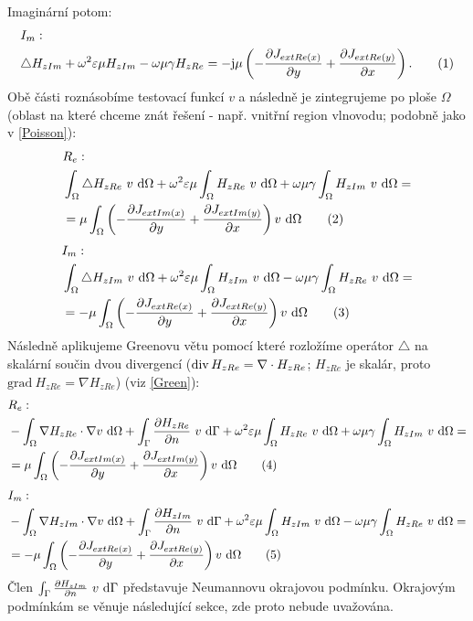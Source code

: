 \documentclass[12pt,a4paper,oneside]{article}
\numberwithin{equation}{section} %
\numberwithin{figure}{section} %
\numberwithin{table}{section} %
\newcommand{\mj}{\mathrm{j}} %
\newcommand{\grad}{\mathrm{grad}\ }
\newcommand\numberthis{\addtocounter{equation}{1}\tag{\theequation}}
\begin{document}
Imaginární potom:
\begin{align*}
&I_{m}:
\\
&\triangle H _{zIm} + \omega ^2 \varepsilon \mu H _{zIm} - \omega \mu \gamma H _{zRe} = - \mj \mu \left( - \frac{\partial J _{extRe(x)}}{\partial y} + \frac{\partial J _{extRe(y)}}{\partial x} \right) .
\numberthis
\end{align*}
Obě části roznásobíme testovací funkcí $v$ a následně je  zintegrujeme po ploše $\Omega$ (oblast na které chceme znát řešení - např. vnitřní region vlnovodu; podobně jako v \ref{Poisson}):
\begin{align*}
&R_e:
\\
&\int _{\Omega} \triangle H _{zRe} ~ v ~ \ud \Omega + \omega ^2 \varepsilon \mu \int _{\Omega} H _{zRe} ~ v ~ \ud \Omega + \omega \mu \gamma \int _{\Omega} H _{zIm} ~ v ~ \ud \Omega = 
\\
&= \mu \int _{\Omega} \left( - \frac{\partial J _{extIm(x)}}{\partial y} + \frac{\partial J _{extIm(y)}}{\partial x} \right) v ~ \ud \Omega
\numberthis
\end{align*}
\begin{align*}
&I_m:
\\
&\int _{\Omega} \triangle H _{zIm} ~ v ~ \ud \Omega + \omega ^2 \varepsilon \mu \int _{\Omega} H _{zIm} ~ v ~ \ud \Omega - \omega \mu \gamma \int _{\Omega} H _{zRe} ~ v ~ \ud \Omega = 
\\
&= - \mu \int _{\Omega} \left( - \frac{\partial J _{extRe(x)}}{\partial y} + \frac{\partial J _{extRe(y)}}{\partial x} \right) v ~ \ud \Omega
\numberthis
\end{align*}
Následně aplikujeme Greenovu větu pomocí které rozložíme operátor $\triangle$ na skalární součin dvou divergencí ($\mathop{\rm div}\nolimits H _{zRe} = \nabla \cdot H _{zRe}$; $H _{zRe}$ je skalár, proto $\grad H _{zRe} = \nabla H _{zRe}$) (viz \ref{Green}):
\begin{align*}
&R_e:
\\
&- \int _{\Omega} \nabla H _{zRe} \cdot \nabla v ~ \ud \Omega + \int _{\Gamma} \frac{\partial H _{zRe}}{\partial n} ~ v ~ \ud \Gamma + \omega ^2 \varepsilon \mu \int _{\Omega} H _{zRe} ~ v ~ \ud \Omega + \omega \mu \gamma \int _{\Omega} H _{zIm} ~ v ~ \ud \Omega =
\\
&= \mu \int _{\Omega} \left( - \frac{\partial J _{extIm(x)}}{\partial y} + \frac{\partial J _{extIm(y)}}{\partial x} \right) v ~ \ud \Omega
\numberthis
\end{align*}
\begin{align*}
&I_m:
\\
&- \int _{\Omega} \nabla H _{zIm} \cdot \nabla v ~ \ud \Omega + \int _{\Gamma} \frac{\partial H _{zIm}}{\partial n} ~ v ~ \ud \Gamma + \omega ^2 \varepsilon \mu \int _{\Omega} H _{zIm} ~ v ~ \ud \Omega - \omega \mu \gamma \int _{\Omega} H _{zRe} ~ v ~ \ud \Omega = 
\\
&= - \mu \int _{\Omega} \left( - \frac{\partial J _{extRe(x)}}{\partial y} + \frac{\partial J _{extRe(y)}}{\partial x} \right) v ~ \ud \Omega
\numberthis
\end{align*}
Člen $\int _{\Gamma} \frac{\partial H _{zIm}}{\partial n} ~ v ~ \mathrm{d} \Gamma$ představuje Neumannovu okrajovou podmínku. Okrajovým podmínkám se věnuje následující sekce, zde proto nebude uvažována.
\end{document}
